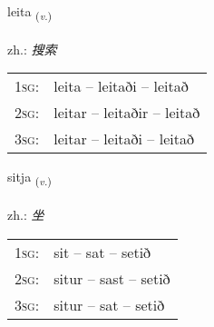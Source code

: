 \documentclass[frontgrid, backgrid]{flacards}\usepackage[]{graphicx}\usepackage[]{xcolor}
\begin{document}
\renewcommand{\flhead}{\vskip5pt \fboxsep=0pt {\small\bfseries\footnotesize Sagnorð | 动词}}
\renewcommand{\fcfoot}{\vskip5pt \fboxsep=0pt \hspace{2pt}{\small\bfseries\footnotesize 1K}}

\renewcommand{\blhead}{\vskip5pt {\small\bfseries\footnotesize Sagnorð | 动词 }}
\renewcommand{\bcfoot}{\vskip5pt \hspace{2pt}{\small\bfseries\footnotesize 1K}}


{leita \small{\textsubscript{(\textit{v.})}} \\[1ex] %
\textphonetic{[leiːta]} \\
zh.: \emph{搜索} \\  [2ex]
\renewcommand*{\arraystretch}{0.8}
\begin{tabular}{p{1cm}l}
\textsc{1sg}: & leita -- leitaði -- leitað \\ 
\textsc{2sg}: & leitar -- leitaðir -- leitað \\ 
\textsc{3sg}: & leitar -- leitaði -- leitað \\ 
\end{tabular}
}

\renewcommand{\flhead}{\vskip5pt \fboxsep=0pt {\small\bfseries\footnotesize Sagnorð | 动词}}
\renewcommand{\fcfoot}{\vskip5pt \fboxsep=0pt \hspace{2pt}{\small\bfseries\footnotesize 1K}}

\renewcommand{\blhead}{\vskip5pt {\small\bfseries\footnotesize Sagnorð | 动词 }}
\renewcommand{\bcfoot}{\vskip5pt \hspace{2pt}{\small\bfseries\footnotesize 1K}}


{sitja \small{\textsubscript{(\textit{v.})}} \\[1ex] %
\textphonetic{[sɪːtja]} \\
zh.: \emph{坐} \\  [2ex]
\renewcommand*{\arraystretch}{0.8}
\begin{tabular}{p{1cm}l}
\textsc{1sg}: & sit -- sat -- setið \\ 
\textsc{2sg}: & situr -- sast -- setið \\ 
\textsc{3sg}: & situr -- sat -- setið \\ 
\end{tabular}
}
\end{document}

